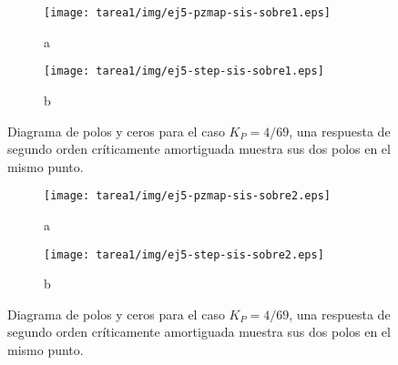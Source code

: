 \begin{ejercicio}
    \begin{figure}[H]
      \centering
      \begin{subfigure}{0.48\textwidth}
        \centering
        \texttt{[image: tarea1/img/ej5-pzmap-sis-sobre1.eps]}
        \caption{a}
        \label{ej5:img4:a}
      \end{subfigure}
      \begin{subfigure}{0.48\textwidth}
        \centering
        \texttt{[image: tarea1/img/ej5-step-sis-sobre1.eps]}
        \caption{b}
        \label{ej5:img4:b}
      \end{subfigure}
      \caption{Diagrama de polos y ceros para el caso $K_P = 4/69$, una respuesta de segundo orden críticamente amortiguada muestra sus dos polos en el mismo punto.}
      \label{ej5:img4}
    \end{figure}

    \begin{figure}[H]
      \centering
      \begin{subfigure}{0.48\textwidth}
        \centering
        \texttt{[image: tarea1/img/ej5-pzmap-sis-sobre2.eps]}
        \caption{a}
        \label{ej5:img5:a}
      \end{subfigure}
      \begin{subfigure}{0.48\textwidth}
        \centering
        \texttt{[image: tarea1/img/ej5-step-sis-sobre2.eps]}
        \caption{b}
        \label{ej5:img5:b}
      \end{subfigure}
      \caption{Diagrama de polos y ceros para el caso $K_P = 4/69$, una respuesta de segundo orden críticamente amortiguada muestra sus dos polos en el mismo punto.}
      \label{ej5:img5}
    \end{figure}

\end{ejercicio}